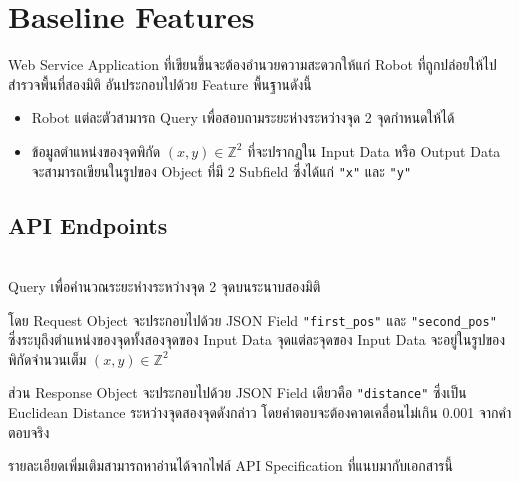 
%

\section{Baseline Features}

Web Service Application ที่เขียนขึ้นจะต้องอำนวยความสะดวกให้แก่ Robot ที่ถูกปล่อยให้ไปสำรวจพื้นที่สองมิติ อันประกอบไปด้วย Feature พื้นฐานดังนี้
\begin{itemize}[topsep=0pc,itemsep=0pc]
\item  
    Robot แต่ละตัวสามารถ Query เพื่อสอบถามระยะห่างระหว่างจุด 2 จุดกำหนดให้ได้
\item
    ข้อมูลตำแหน่งของจุดพิกัด $(x, y) \in \mathbb{Z}^2$ ที่จะปรากฏใน Input Data หรือ Output Data จะสามารถเขียนในรูปของ Object ที่มี 2 Subfield ซึ่งได้แก่ \lstinline{"x"} และ \lstinline{"y"}
\end{itemize}

\subsection{API Endpoints}

\begin{description}[parsep=0.5pc]
\item[\npt{POST}{/distance}] ~ \\
    Query เพื่อคำนวณระยะห่างระหว่างจุด 2 จุดบนระนาบสองมิติ
    
    โดย Request Object จะประกอบไปด้วย JSON Field \lstinline{"first_pos"} และ \lstinline{"second_pos"} ซึ่งระบุถึงตำแหน่งของจุดทั้งสองจุดของ Input Data \;
    จุดแต่ละจุดของ Input Data จะอยู่ในรูปของพิกัดจำนวนเต็ม $(x, y) \in \mathbb{Z}^2$
    
    ส่วน Response Object จะประกอบไปด้วย JSON Field เดียวคือ \lstinline{"distance"} ซึ่งเป็น Euclidean Distance ระหว่างจุดสองจุดดังกล่าว โดยคำตอบจะต้องคาดเคลื่อนไม่เกิน 0.001 จากคำตอบจริง
\end{description}

\noindent        
รายละเอียดเพิ่มเติมสามารถหาอ่านได้จากไฟล์ API Specification ที่แนบมากับเอกสารนี้

